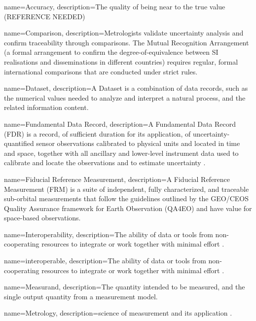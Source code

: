 %
%
{name={Accuracy},
description={The quality of being near to the true value (REFERENCE NEEDED)}}

{name={Comparison},
description={Metrologists validate uncertainty analysis and confirm traceability through comparisons. The Mutual Recognition Arrangement (a formal arrangement to confirm the degree-of-equivalence between \ac{SI} realisations and disseminations in different countries) requires regular, formal international comparisons that are conducted under strict rules.}}

{name={Dataset},
description={A Dataset is a combination of data records, such as the numerical
values needed to analyze and interpret a natural process, and the related
information content.}}

{name={Fundamental Data Record},
description={A Fundamental Data Record (FDR) is a record, of sufficient duration for its
application, of uncertainty-quantified sensor observations calibrated to physical
units and located in time and space, together with all ancillary and lower-level
instrument data used to calibrate and locate the observations and to estimate
uncertainty \cite{QA4EO1}.}}

{name={Fiducial Reference Measurement},
description={A Fiducial Reference Measurement (FRM) is a suite of independent,
fully characterized, and traceable sub-orbital measurements that follow the 
guidelines outlined by the GEO/CEOS Quality Assurance framework for Earth 
Observation (QA4EO) and have value for space-based observations.}}

{name={Interoperability},
description={The ability of data or tools from non-cooperating resources to
integrate or work together with minimal effort \cite{wilkinson16}.}}

{name={interoperable},
description={The ability of data or tools from non-cooperating resources to
integrate or work together with minimal effort \cite{wilkinson16}.}}

{name={Measurand},
description={The quantity intended to be measured, and the single output quantity from a measurement model.}}

{name={Metrology},
description={science of measurement and its application \cite{JCGMVIM}.}}

